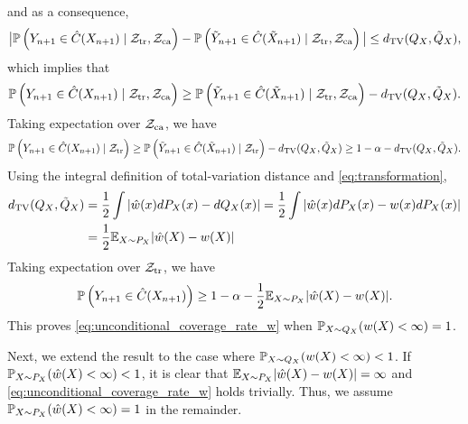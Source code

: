 and as a consequence,
\begin{equation}
  \label{eq:tv_Q_tdQ}
  \big|\P\lb Y_{n+1}\in \hat{C}(X_{n+1})\mid \Z_{\tr}, \Z_{\ca}\rb - \P\lb\td{Y}_{n+1}\in \hat{C}(\td{X}_{n+1})\mid \Z_{\tr}, \Z_{\ca}\rb\big|\le \tv(Q_{X}, \td{Q}_{X}),
\end{equation}
which implies that 
\[\P\lb Y_{n+1}\in \hat{C}(X_{n+1})\mid \Z_{\tr}, \Z_{\ca}\rb\ge \P\lb \td{Y}_{n+1}\in \hat{C}(\td{X}_{n+1})\mid \Z_{\tr}, \Z_{\ca}\rb - \tv(Q_{X}, \td{Q}_{X}).\]
Taking expectation over $\Z_{\ca}$, we have
\[\P\lb Y_{n+1}\in \hat{C}(X_{n+1})\mid \Z_{\tr}\rb \ge \P\lb \td{Y}_{n+1}\in \hat{C}(\td{X}_{n+1})\mid \Z_{\tr}\rb - \tv(Q_{X}, \td{Q}_{X})\ge 1 - \alpha - \tv(Q_{X}, \td{Q}_{X}).\]
Using the integral definition of total-variation distance and \eqref{eq:transformation},
\begin{align*}
  \tv(Q_{X}, \td{Q}_{X}) & = \frac{1}{2}\int |\hat{w}(x)dP_{X}(x) - dQ_{X}(x)| = \frac{1}{2}\int |\hat{w}(x)dP_{X}(x) - w(x)dP_{X}(x)|\\
  & = \frac{1}{2}\E_{X\sim P_{X}}|\hat{w}(X) - w(X)|
\end{align*}
Taking expectation over $\Z_{\tr}$, we have
\[\P\lb Y_{n+1}\in \hat{C}(X_{n+1})\rb\ge 1 - \alpha - \frac{1}{2}\E_{X\sim P_{X}}|\hat{w}(X) - w(X)|.\]
This proves \eqref{eq:unconditional_coverage_rate_w} when $\P_{X\sim Q_{X}}(w(X) < \infty) = 1$.

Next, we extend the result to the case where $\P_{X\sim Q_{X}}(w(X) < \infty) < 1$. If $\P_{X\sim P_{X}}(\hat{w}(X) < \infty) < 1$, it is clear that $\E_{X\sim P_{X}}|\hat{w}(X) - w(X)| = \infty$ and \eqref{eq:unconditional_coverage_rate_w} holds trivially. Thus, we assume $\P_{X\sim P_{X}}(\hat{w}(X) < \infty) = 1$ in the remainder.

